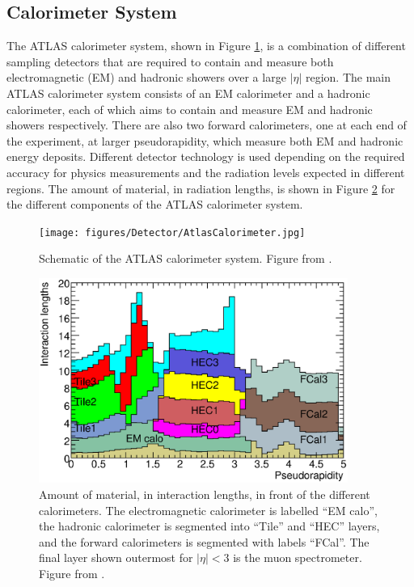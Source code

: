 \subsection{Calorimeter System}
\label{sec:Det:Calo}

The ATLAS calorimeter system, shown in Figure \ref{Det:ATLASCalo}, is a combination of different sampling detectors that are required to contain and measure both electromagnetic (EM) and hadronic showers over a large $|\eta|$ region. 
The main ATLAS calorimeter system consists of an EM calorimeter and a hadronic calorimeter, each of which aims to contain and measure EM and hadronic showers respectively. 
There are also two forward calorimeters, one at each end of the experiment, at larger pseudorapidity, which measure both EM and hadronic energy deposits.
Different detector technology is used depending on the required accuracy for physics measurements and the radiation levels expected in different regions.
The amount of material, in radiation lengths, is shown in Figure \ref{Det:RadLegnth} for the different components of the ATLAS calorimeter system. 


\begin{figure}
  \centering
  \texttt{[image: figures/Detector/AtlasCalorimeter.jpg]}
\caption[The ATLAS Calorimeter System]{
Schematic of the ATLAS calorimeter system.
Figure from \cite{ref:ATLASExp}.
\label{Det:ATLASCalo}
}
\end{figure}

\begin{figure}
  \centering
  \includegraphics[width=0.9\textwidth]{figures/Detector/CalorimeterRadLegnths.eps}
  \caption[Radiation Lengths of the Calorimeter Sub-detectors ]{
Amount of material, in interaction lengths, in front of the different calorimeters.
The electromagnetic calorimeter is labelled ``EM calo'', the hadronic calorimeter is segmented into ``Tile'' and ``HEC'' layers, and the forward calorimeters is segmented with labels ``FCal''.
The final layer shown outermost for $|\eta|<3$ is the muon spectrometer.
Figure from \cite{ref:ATLASExp}.
\label{Det:RadLegnth}
}
\end{figure}





